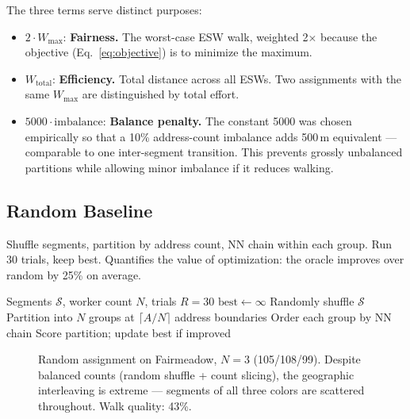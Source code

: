 \documentclass[conference]{IEEEtran}
\begin{document}
The three terms serve distinct purposes:
\begin{itemize}
\item $2 \cdot W_{\max}$: \textbf{Fairness.} The worst-case ESW walk, weighted 2$\times$ because the objective (Eq.~\ref{eq:objective}) is to minimize the maximum.
\item $W_{\text{total}}$: \textbf{Efficiency.} Total distance across all ESWs. Two assignments with the same $W_{\max}$ are distinguished by total effort.
\item $5000 \cdot \text{imbalance}$: \textbf{Balance penalty.} The constant 5000 was chosen empirically so that a 10\% address-count imbalance adds 500\,m equivalent --- comparable to one inter-segment transition. This prevents grossly unbalanced partitions while allowing minor imbalance if it reduces walking.
\end{itemize}

\subsection{Random Baseline}

Shuffle segments, partition by address count, NN chain within each group. Run 30 trials, keep best. Quantifies the value of optimization: the oracle improves over random by 25\% on average.

\begin{algorithm}[htbp]
\caption{Random Baseline}
\begin{algorithmic}[1]
\REQUIRE Segments $\mathcal{S}$, worker count $N$, trials $R = 30$
\STATE $\text{best} \leftarrow \infty$
    \STATE Randomly shuffle $\mathcal{S}$
    \STATE Partition into $N$ groups at $\lceil A/N \rceil$ address boundaries
    \STATE Order each group by NN chain
    \STATE Score partition; update best if improved
\ENDFOR
\end{algorithmic}
\end{algorithm}

\begin{figure}[htbp]
\centering
{}
\caption{Random assignment on Fairmeadow, $N=3$ (105/108/99). Despite balanced counts (random shuffle + count slicing), the geographic interleaving is extreme --- segments of all three colors are scattered throughout. Walk quality: 43\%.}
\end{figure}
\end{document}
